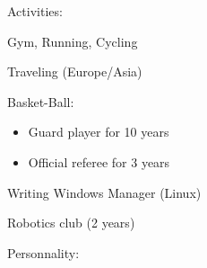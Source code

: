 \documentclass[letterpaper]{jm-cv} %
\begin{document}


\vspace{-0.2cm}

\begin{multicols}{2}
  \small {

    Activities:

    {\color{mainblue}\faSmileO} Gym, Running, Cycling

    {\color{mainblue}\faUser} Traveling (Europe/Asia)

    {\color{mainblue}\faDribbble} Basket-Ball:

    {\footnotesize
      \vspace{-0.2cm}
      \begin{itemize}
      \item[\color{maingray}\faArrowRight] Guard player for 10 years
      \item[\color{maingray}\faArrowRight] Official referee for 3 years
      \end{itemize}
    }
    \vspace{-0.2cm}
           {\color{mainblue}\faTerminal} Writing Windows Manager (Linux)

           {\color{mainblue}\faCogs} Robotics club (2 years)

           Personnality:

  }

\end{multicols}
\end{document}
